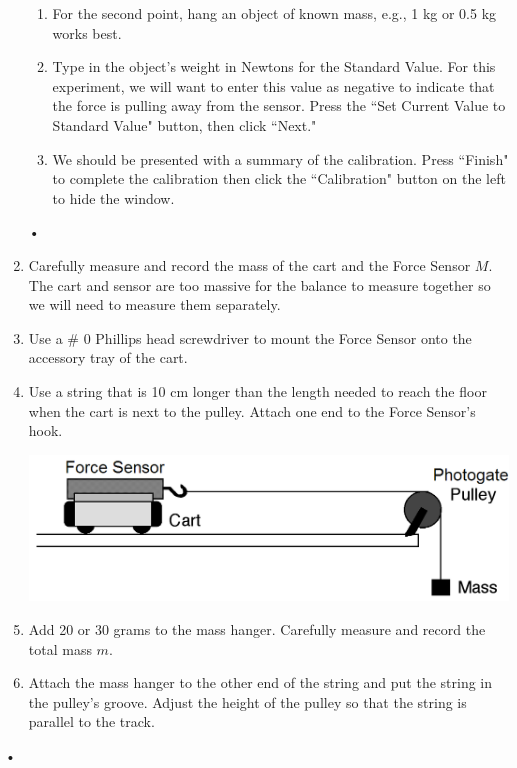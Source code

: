 \documentclass[main.tex]{subfiles}
\begin{document}
\begin{enumerate}
\begin{enumerate}
\item
For the second point, hang an object of known mass, e.g., 1 kg or 0.5 kg works best.
\item
Type in the object's weight in Newtons for the Standard Value. For this experiment, we will want to enter this value as negative to indicate that the force is pulling away from the sensor. Press the ``Set Current Value to Standard Value" button, then click ``Next."
\item
We should be presented with a summary of the calibration. Press ``Finish" to complete the calibration then click the ``Calibration" button on the left to hide the window.
\end{enumerate}•
\item
Carefully measure and record the mass of the cart and the Force Sensor $M.$ The cart and sensor are too massive for the balance to measure together so we will need to measure them separately.
\item
Use a \# 0 Phillips head screwdriver to mount the Force Sensor onto the accessory tray of the cart. 
\item
Use a string that is 10 cm longer than the length needed to reach the floor when the cart is next to the pulley. Attach one end to the Force Sensor's hook.

\includegraphics[width=\textwidth]{Force_2_Setup}

\item
Add 20 or 30 grams to the mass hanger. Carefully measure and record the total mass $m.$
\item
Attach the mass hanger to the other end of the string and put the string in the pulley's groove. Adjust the height of the pulley so that the string is parallel to the track.
\end{enumerate}•
\end{document}
